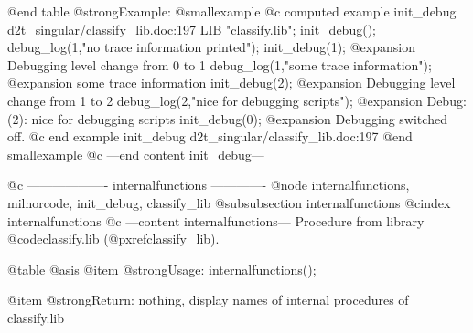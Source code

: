 @end table
@strong{Example:}
@smallexample
@c computed example init_debug d2t_singular/classify_lib.doc:197 
LIB "classify.lib";
init_debug();
debug_log(1,"no trace information printed");
init_debug(1);
@expansion{} Debugging level change from  0  to  1
debug_log(1,"some trace information");
@expansion{} some trace information
init_debug(2);
@expansion{} Debugging level change from  1  to  2
debug_log(2,"nice for debugging scripts");
@expansion{} Debug:(2):  nice for debugging scripts
init_debug(0);
@expansion{} Debugging switched off.
@c end example init_debug d2t_singular/classify_lib.doc:197
@end smallexample
@c ---end content init_debug---

@c ------------------- internalfunctions -------------
@node internalfunctions, milnorcode, init_debug, classify_lib
@subsubsection internalfunctions
@cindex internalfunctions
@c ---content internalfunctions---
Procedure from library @code{classify.lib} (@pxref{classify_lib}).

@table @asis
@item @strong{Usage:}
internalfunctions();

@item @strong{Return:}
nothing, display names of internal procedures of classify.lib

